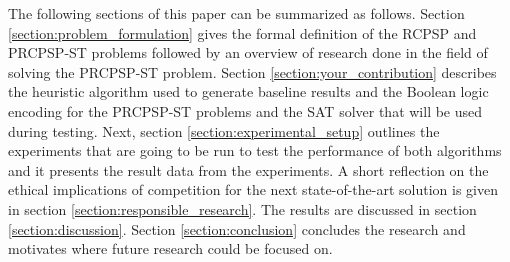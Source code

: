 The following sections of this paper can be summarized as follows. Section \ref{section:problem_formulation} gives the formal definition of the RCPSP and PRCPSP-ST problems followed by an overview of research done in the field of solving the PRCPSP-ST problem. Section \ref{section:your_contribution} describes the heuristic algorithm used to generate baseline results and the Boolean logic encoding for the PRCPSP-ST problems and the SAT solver that will be used during testing. Next, section \ref{section:experimental_setup} outlines the experiments that are going to be run to test the performance of both algorithms and it presents the result data from the experiments. A short reflection on the ethical implications of competition for the next state-of-the-art solution is given in section \ref{section:responsible_research}. The results are discussed in section \ref{section:discussion}. Section \ref{section:conclusion} concludes the research and motivates where future research could be focused on.